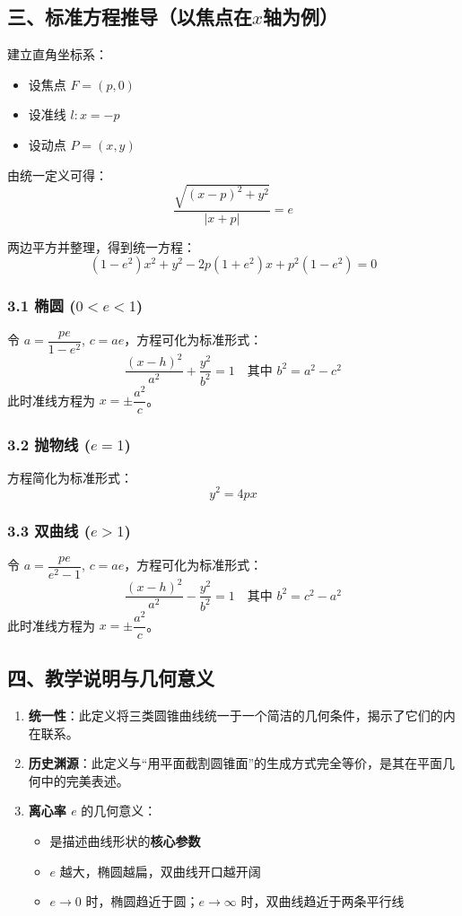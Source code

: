 \documentclass{ctexart}
\begin{document}
	\subsection*{三、标准方程推导（以焦点在$x$轴为例）}
	
	建立直角坐标系：
	\begin{itemize}
		\item 设焦点 \( F = (p, 0) \)
		\item 设准线 \( l: x = -p \)
		\item 设动点 \( P = (x, y) \)
	\end{itemize}
	
	由统一定义可得：
	\[
	\frac{\sqrt{(x - p)^2 + y^2}}{|x + p|} = e
	\]
	
	两边平方并整理，得到统一方程：
	\[
	(1 - e^2)x^2 + y^2 - 2p(1 + e^2)x + p^2(1 - e^2) = 0
	\]
	
	\subsubsection*{3.1 椭圆 (\( 0 < e < 1 \))}
	令 \( a = \dfrac{p e}{1 - e^2} \), \( c = ae \)，方程可化为标准形式：
	\[
	\frac{(x - h)^2}{a^2} + \frac{y^2}{b^2} = 1 \quad \text{其中 } b^2 = a^2 - c^2
	\]
	此时准线方程为 \( x = \pm \dfrac{a^2}{c} \)。
	
	\subsubsection*{3.2 抛物线 (\( e = 1 \))}
	方程简化为标准形式：
	\[
	y^2 = 4px
	\]
	
	\subsubsection*{3.3 双曲线 (\( e > 1 \))}
	令 \( a = \dfrac{p e}{e^2 - 1} \), \( c = ae \)，方程可化为标准形式：
	\[
	\frac{(x - h)^2}{a^2} - \frac{y^2}{b^2} = 1 \quad \text{其中 } b^2 = c^2 - a^2
	\]
	此时准线方程为 \( x = \pm \dfrac{a^2}{c} \)。
	
	\subsection*{四、教学说明与几何意义}
	
	\begin{enumerate}
		\item \textbf{统一性}：此定义将三类圆锥曲线统一于一个简洁的几何条件，揭示了它们的内在联系。
		
		\item \textbf{历史渊源}：此定义与“用平面截割圆锥面”的生成方式完全等价，是其在平面几何中的完美表述。
		
		\item \textbf{离心率 \( e \)} 的几何意义：
		\begin{itemize}
			\item 是描述曲线形状的\textbf{核心参数}
			\item \( e \) 越大，椭圆越扁，双曲线开口越开阔
			\item \( e \to 0 \) 时，椭圆趋近于圆；\( e \to \infty \) 时，双曲线趋近于两条平行线
		\end{itemize}
	\end{enumerate}
\end{document}
